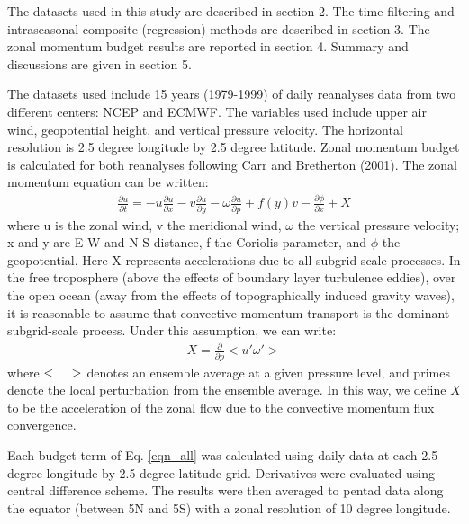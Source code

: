 \documentclass[12pt]{article}
\begin{document}
  The datasets used in this study are described in section 2.  The
time filtering and intraseasonal composite (regression) methods are
described in section 3.  The zonal momentum budget results are reported in
section 4. Summary and discussions are given in section 5.
\\

  
  The datasets used include 15 years (1979-1999) of daily reanalyses data
from two different centers: NCEP and ECMWF. The variables used include
upper air wind, geopotential height, and vertical pressure velocity.
The horizontal resolution is 2.5 degree longitude by 2.5 degree latitude.
Zonal momentum budget is calculated for both 
reanalyses following Carr and Bretherton (2001).  The zonal momentum
equation can be written:
\begin{eqnarray}
\frac{\partial u}{\partial t} = 
- u \frac{\partial u}{\partial x}
- v \frac{\partial u}{\partial y}
- \omega \frac{\partial u}{\partial p}
+ f(y) v
- \frac{\partial \phi}{\partial x}
+ X 
\label{eqn_all}
\end{eqnarray}
where u is the zonal wind, v the meridional wind, $\omega$ the
vertical pressure velocity; x and y are E-W and N-S distance, f the
Coriolis parameter, and $\phi$ the geopotential.
Here X represents accelerations due to all subgrid-scale
processes. In the free troposphere (above the effects of boundary
layer turbulence eddies), over the open ocean (away from the effects
of topographically induced gravity waves), it is reasonable to assume
that convective momentum transport is the dominant subgrid-scale
process. Under this assumption, we can write:
\begin{eqnarray}
X = \frac{\partial}{\partial p} <u' \omega '>
\label{eqn_residual}
\end{eqnarray}
where $< \hspace*{0.2in}>$ denotes an ensemble average at a given pressure
level, and primes denote the local perturbation from the ensemble
average.  In this way, we define $X$ to be the acceleration of the
zonal flow due to the convective momentum flux convergence. 

  Each budget term of Eq. \ref{eqn_all} was calculated using daily
data at each 2.5 degree longitude by 2.5 degree latitude
grid. Derivatives were evaluated using central difference scheme. The
results were then averaged to pentad data along the equator (between
5N and 5S) with a zonal resolution of 10 degree longitude.
\end{document}
